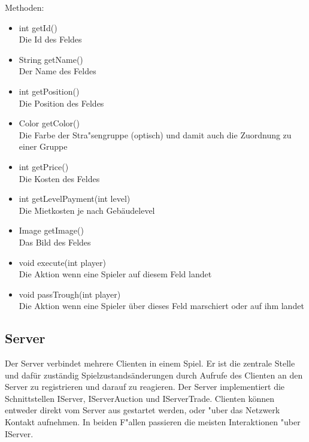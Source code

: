 \documentclass[a4paper,10pt]{article}
\begin{document}
\begin{itemize}
Methoden:
\begin{itemize}
\item int getId()
\\Die Id des Feldes
\item String getName()
\\Der Name des Feldes
\item int getPosition()
\\Die Position des Feldes
\item Color getColor()
\\Die Farbe der Stra"sengruppe (optisch) und damit auch die Zuordnung zu einer Gruppe
\item int getPrice()
\\Die Kosten des Feldes
\item int getLevelPayment(int level)
\\Die Mietkosten je nach Gebäudelevel
\item Image getImage()
\\Das Bild des Feldes
\item void execute(int player)
\\Die Aktion wenn eine Spieler auf diesem Feld landet
\item void passTrough(int player)
\\Die Aktion wenn eine Spieler über dieses Feld marschiert oder auf ihm landet
\end{itemize} %
\end{itemize} %

\subsection{Server}

Der Server verbindet mehrere Clienten in einem Spiel. Er ist die zentrale Stelle und dafür zuständig Spielzustandsänderungen durch Aufrufe des Clienten an den Server zu registrieren und darauf zu reagieren. Der Server implementiert die Schnittstellen IServer, IServerAuction und IServerTrade. Clienten können entweder direkt vom Server aus gestartet werden, oder "uber das Netzwerk Kontakt aufnehmen. In beiden F"allen passieren die meisten Interaktionen "uber IServer.
\end{document}
